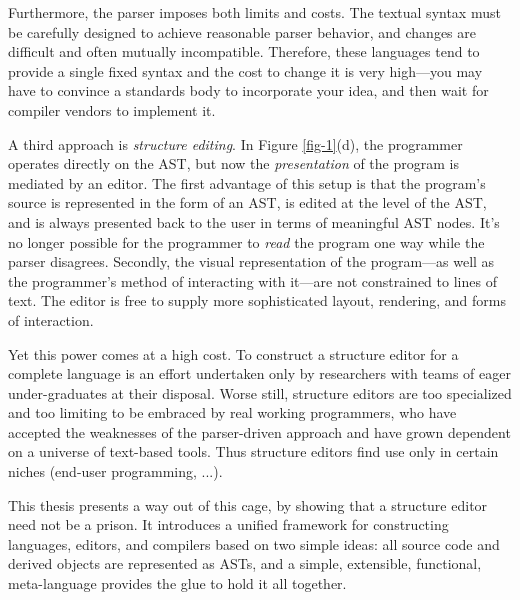Furthermore, the parser imposes both limits and costs. The textual syntax must be carefully designed to achieve reasonable parser behavior, and changes are difficult and often mutually incompatible. Therefore, these languages tend to provide a single fixed syntax and the cost to change it is very high---you may have to convince a standards body to incorporate your idea, and then wait for compiler vendors to implement it.

A third approach is \emph{structure editing}. In Figure \ref{fig-1}(d), the programmer operates directly on the AST, but now the \emph{presentation} of the program is mediated by an editor. The first advantage of this setup is that the program's source is represented in the form of an AST, is edited at the level of the AST, and is always presented back to the user in terms of meaningful AST nodes. It's no longer possible for the programmer to \emph{read} the program one way while the parser disagrees. Secondly, the visual representation of the program---as well as the programmer's method of interacting with it---are not constrained to lines of text. The editor is free to supply more sophisticated layout, rendering, and forms of interaction.

Yet this power comes at a high cost. To construct a structure editor for a complete language is an effort undertaken only by researchers with teams of eager under-graduates at their disposal. Worse still, structure editors are too specialized and too limiting to be embraced by real working programmers, who have accepted the weaknesses of the parser-driven approach and have grown dependent on a universe of text-based tools. Thus structure editors find use only in certain niches (end-user programming, ...)\cite{??}.



This thesis presents a way out of this cage, by showing that a structure editor need not be a prison. It introduces a unified framework for constructing languages, editors, and compilers based on two simple ideas: all source code and derived objects are represented as ASTs, and a simple, extensible, functional, meta-language provides the glue to hold it all together.

\begin{figure}[h]
  \caption{\label{fig-2}\Meta}
\end{figure}


